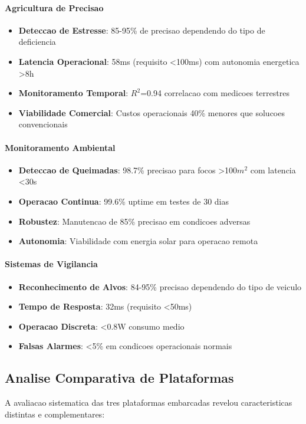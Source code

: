 \paragraph{Agricultura de Precisao}
\begin{itemize}
    \item \textbf{Deteccao de Estresse}: 85-95\% de precisao dependendo do tipo de deficiencia
    \item \textbf{Latencia Operacional}: 58ms (requisito <100ms) com autonomia energetica >8h
    \item \textbf{Monitoramento Temporal}: $R^2$=0.94 correlacao com medicoes terrestres
    \item \textbf{Viabilidade Comercial}: Custos operacionais 40\% menores que solucoes convencionais
\end{itemize}

\paragraph{Monitoramento Ambiental}
\begin{itemize}
    \item \textbf{Deteccao de Queimadas}: 98.7\% precisao para focos >100$m^2$ com latencia <30s
    \item \textbf{Operacao Continua}: 99.6\% uptime em testes de 30 dias
    \item \textbf{Robustez}: Manutencao de 85\% precisao em condicoes adversas
    \item \textbf{Autonomia}: Viabilidade com energia solar para operacao remota
\end{itemize}

\paragraph{Sistemas de Vigilancia}
\begin{itemize}
    \item \textbf{Reconhecimento de Alvos}: 84-95\% precisao dependendo do tipo de veiculo
    \item \textbf{Tempo de Resposta}: 32ms (requisito <50ms)
    \item \textbf{Operacao Discreta}: <0.8W consumo medio
    \item \textbf{Falsas Alarmes}: <5\% em condicoes operacionais normais
\end{itemize}

\subsection{Analise Comparativa de Plataformas}
A avaliacao sistematica das tres plataformas embarcadas revelou caracteristicas distintas e complementares:

